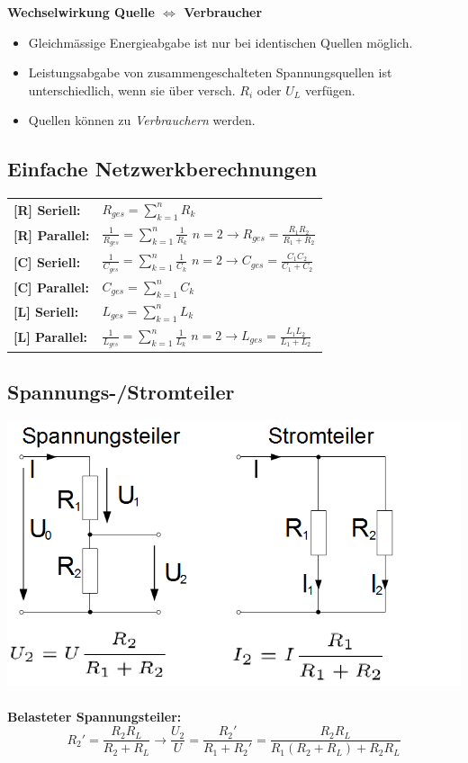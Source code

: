 \documentclass[a4paper, 6pt, landscape]{scrartcl}
\begin{document}
\begin{multicols*}{4}
				\textbf{Wechselwirkung Quelle $\Leftrightarrow$ Verbraucher}
				\begin{itemize}
					\item Gleichmässige Energieabgabe ist nur bei identischen Quellen möglich.
					\item Leistungsabgabe von zusammengeschalteten Spannungsquellen ist unterschiedlich, wenn sie über versch. $R_i$ oder $U_L$ verfügen.
					\item Quellen können zu \textit{Verbrauchern} werden.			
				\end{itemize}
				
				\subsection{Einfache Netzwerkberechnungen}
				\begin{tabular}{ll}
					\textbf{[R] Seriell:} &$R_{ges}=\sum\limits_{k=1}^{n}{R_k}$\\
					\textbf{[R] Parallel:} &$\frac{1}{R_{ges}}=\sum\limits_{k=1}^{n}{\frac{1}{R_k}}$ \quad $n=2\rightarrow R_{ges}=\frac{R_1R_2}{R_1+R_2}$\\
					\textbf{[C] Seriell:} &$\frac{1}{C_{ges}}=\sum\limits_{k=1}^{n}{\frac{1}{C_k}}$ \quad $n=2\rightarrow C_{ges}=\frac{C_1C_2}{C_1+C_2}$\\
					\textbf{[C] Parallel:} &$C_{ges}=\sum\limits_{k=1}^{n}{C_k}$\\
					\textbf{[L] Seriell:} &$L_{ges}=\sum\limits_{k=1}^{n}{L_k}$\\
					\textbf{[L] Parallel:} &$\frac{1}{L_{ges}}=\sum\limits_{k=1}^{n}{\frac{1}{L_k}}$ \quad $n=2\rightarrow L_{ges}=\frac{L_1L_2}{L_1+L_2}$				
				\end{tabular}

				\subsection{Spannungs-/Stromteiler}
				\includegraphics[scale=0.24]{source/teiler.png}\\\\
				\textbf{Belasteter Spannungsteiler:}\\
				$$R_{2}'=\frac{R_2R_L}{R_2+R_L}\rightarrow \frac{U_2}{U}=\frac{R_{2}'}{R_1+R_{2}'}=\frac{R_2R_L}{R_1(R_2+R_L)+R_2R_L}$$


\end{multicols*}
\end{document}
